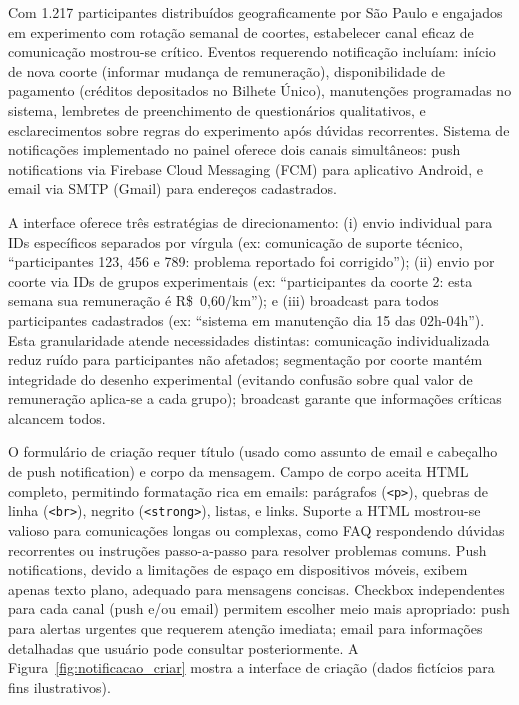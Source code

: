 

Com 1.217 participantes distribuídos geograficamente por São Paulo e engajados em experimento com rotação semanal de coortes, estabelecer canal eficaz de comunicação mostrou-se crítico. Eventos requerendo notificação incluíam: início de nova coorte (informar mudança de remuneração), disponibilidade de pagamento (créditos depositados no Bilhete Único), manutenções programadas no sistema, lembretes de preenchimento de questionários qualitativos, e esclarecimentos sobre regras do experimento após dúvidas recorrentes. Sistema de notificações implementado no painel oferece dois canais simultâneos: push notifications via Firebase Cloud Messaging (FCM) para aplicativo Android, e email via SMTP (Gmail) para endereços cadastrados.

A interface oferece três estratégias de direcionamento: (i) envio individual para IDs específicos separados por vírgula (ex: comunicação de suporte técnico, ``participantes 123, 456 e 789: problema reportado foi corrigido''); (ii) envio por coorte via IDs de grupos experimentais (ex: ``participantes da coorte 2: esta semana sua remuneração é R\$~0,60/km''); e (iii) broadcast para todos participantes cadastrados (ex: ``sistema em manutenção dia 15 das 02h-04h''). Esta granularidade atende necessidades distintas: comunicação individualizada reduz ruído para participantes não afetados; segmentação por coorte mantém integridade do desenho experimental (evitando confusão sobre qual valor de remuneração aplica-se a cada grupo); broadcast garante que informações críticas alcancem todos.

O formulário de criação requer título (usado como assunto de email e cabeçalho de push notification) e corpo da mensagem. Campo de corpo aceita HTML completo, permitindo formatação rica em emails: parágrafos (\texttt{<p>}), quebras de linha (\texttt{<br>}), negrito (\texttt{<strong>}), listas, e links. Suporte a HTML mostrou-se valioso para comunicações longas ou complexas, como FAQ respondendo dúvidas recorrentes ou instruções passo-a-passo para resolver problemas comuns. Push notifications, devido a limitações de espaço em dispositivos móveis, exibem apenas texto plano, adequado para mensagens concisas. Checkbox independentes para cada canal (push e/ou email) permitem escolher meio mais apropriado: push para alertas urgentes que requerem atenção imediata; email para informações detalhadas que usuário pode consultar posteriormente. A Figura~\ref{fig:notificacao_criar} mostra a interface de criação (dados fictícios para fins ilustrativos).

